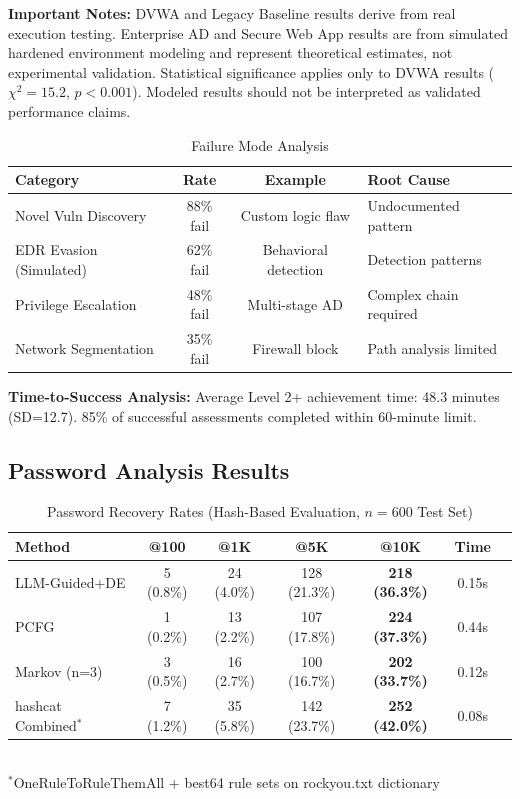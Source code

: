 \documentclass[preprint,12pt]{elsarticle}
\begin{document}
\textbf{Important Notes:} DVWA and Legacy Baseline results derive from real execution testing. Enterprise AD and Secure Web App results are from simulated hardened environment modeling and represent theoretical estimates, not experimental validation. Statistical significance applies only to DVWA results ($\chi^2=15.2$, $p<0.001$). Modeled results should not be interpreted as validated performance claims.
\begin{table}[htbp]
\centering
\caption{Failure Mode Analysis}
\label{tab:failures}
\begin{tabular}{lccl}
\toprule
\textbf{Category} & \textbf{Rate} & \textbf{Example} & \textbf{Root Cause} \\
\midrule
Novel Vuln Discovery & 88\% fail & Custom logic flaw & Undocumented pattern \\
EDR Evasion (Simulated) & 62\% fail & Behavioral detection & Detection patterns \\
Privilege Escalation & 48\% fail & Multi-stage AD & Complex chain required \\
Network Segmentation & 35\% fail & Firewall block & Path analysis limited \\
\bottomrule
\end{tabular}
\end{table}

\textbf{Time-to-Success Analysis:} Average Level 2+ achievement time: 48.3 minutes (SD=12.7). 85\% of successful assessments completed within 60-minute limit.

\subsection{Password Analysis Results}

\begin{table}[htbp]
\centering
\caption{Password Recovery Rates (Hash-Based Evaluation, $n=600$ Test Set)}
\label{tab:password}
\begin{tabular}{lcccccc}
\toprule
\textbf{Method} & \textbf{@100} & \textbf{@1K} & \textbf{@5K} & \textbf{@10K} & \textbf{Time} \\
\midrule
LLM-Guided+DE & 5 (0.8\%) & 24 (4.0\%) & 128 (21.3\%) & \textbf{218 (36.3\%)} & 0.15s \\
PCFG & 1 (0.2\%) & 13 (2.2\%) & 107 (17.8\%) & \textbf{224 (37.3\%)} & 0.44s \\
Markov (n=3) & 3 (0.5\%) & 16 (2.7\%) & 100 (16.7\%) & \textbf{202 (33.7\%)} & 0.12s \\
hashcat Combined$^*$ & 7 (1.2\%) & 35 (5.8\%) & 142 (23.7\%) & \textbf{252 (42.0\%)} & 0.08s \\
\bottomrule
\end{tabular}
\\[6pt]
\footnotesize{$^*$OneRuleToRuleThemAll + best64 rule sets on rockyou.txt dictionary}
\end{table}
\end{document}
